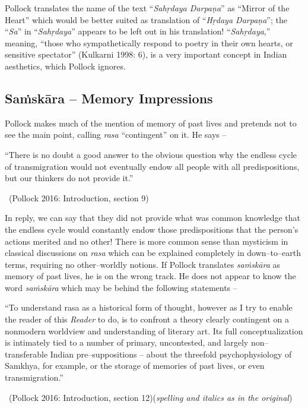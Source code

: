 Pollock translates the name of the text “\textit{Sahṛdaya Darpaṇa}” as “Mirror of the Heart” which would be better suited as translation of “\textit{Hṛdaya Darpaṇa}”; the “\textit{Sa}” in “\textit{Sahṛdaya}” appears to be left out in his translation! “\textit{Sahṛdaya},” meaning, “those who sympathetically respond to poetry in their own hearts, or sensitive spectator” (Kulkarni 1998: 6), is a very important concept in Indian aesthetics, which Pollock ignores.


\subsection*{Saṁskāra – Memory Impressions}

Pollock makes much of the mention of memory of past lives and pretends not to see the main point, calling \textit{rasa} “contingent” on it. He says –

\begin{myquote}
“There is no doubt a good answer to the obvious question why the endless cycle of transmigration would not eventually endow all people with all predispositions, but our thinkers do not provide it.” 

~\hfill (Pollock 2016: Introduction, section 9)
\end{myquote}

In reply, we can say that they did not provide what was common knowledge that the endless cycle would constantly endow those predispositions that the person’s actions merited and no other! There is more common sense than mysticism in classical discussions on \textit{rasa} which can be explained completely in down–to–earth terms, requiring no other–worldly notions. If Pollock translates \textit{saṁskāra} as memory of past lives, he is on the wrong track. He does not appear to know the word \textit{saṁskāra} which may be behind the following statements –

\begin{myquote}
“To understand rasa as a historical form of thought, however as I try to enable the reader of this \textit{Reader} to do, is to confront a theory clearly contingent on a nonmodern worldview and understanding of literary art. Its full conceptualization is intimately tied to a number of primary, uncontested, and largely non–transferable Indian pre–suppositions – about the threefold psychophysiology of Samkhya, for example, or the storage of memories of past lives, or even transmigration.” 

~\hfill (Pollock 2016: Introduction, section 12)(\textit{spelling and italics as in the original})
\end{myquote}

